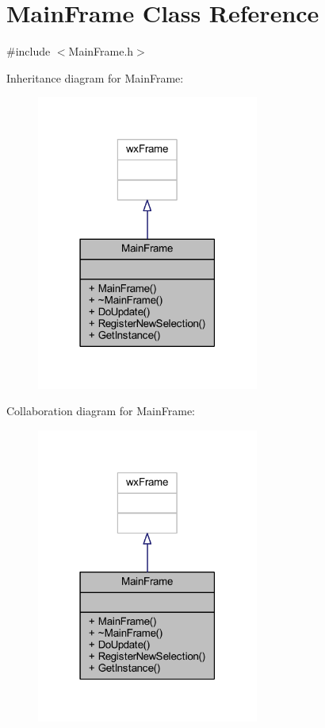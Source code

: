 \hypertarget{class_main_frame}{}\section{Main\+Frame Class Reference}
\label{class_main_frame}


{\ttfamily \#include $<$Main\+Frame.\+h$>$}



Inheritance diagram for Main\+Frame\+:\nopagebreak
\begin{figure}[H]
\begin{center}
\leavevmode
\includegraphics[width=207pt]{class_main_frame__inherit__graph}
\end{center}
\end{figure}


Collaboration diagram for Main\+Frame\+:\nopagebreak
\begin{figure}[H]
\begin{center}
\leavevmode
\includegraphics[width=207pt]{class_main_frame__coll__graph}
\end{center}
\end{figure}
